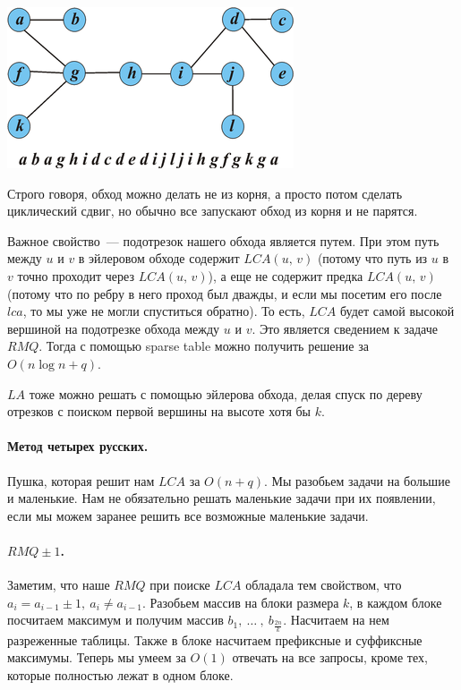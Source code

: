 \documentclass[12pt]{article}
\begin{document}
\begin{center}
\includegraphics{pictures/euler_path_on_tree.png}
\end{center}

Строго говоря, обход можно делать не из корня, а просто потом сделать циклический сдвиг, но обычно все запускают обход из корня и не парятся.

Важное свойство~--- подотрезок нашего обхода является путем. При этом путь между $u$ и $v$ в эйлеровом обходе содержит $LCA(u,\,v)$ (потому что путь из $u$ в $v$ точно проходит через $LCA(u,\,v)$), а еще не содержит предка $LCA(u,\,v)$ (потому что по ребру в него проход был дважды, и если мы посетим его после $lca$, то мы уже не могли спуститься обратно). То есть, $LCA$ будет самой высокой вершиной на подотрезке обхода между $u$ и $v$. Это является сведением к задаче $RMQ$. Тогда с помощью sparse table можно получить решение за $O(n \log n + q)$.

$LA$ тоже можно решать с помощью эйлерова обхода, делая спуск по дереву отрезков с поиском первой вершины на высоте хотя бы $k$.

\paragraph{Метод четырех русских.} Пушка, которая решит нам $LCA$ за $O(n + q)$. Мы разобьем задачи на большие и маленькие. Нам не обязательно решать маленькие задачи при их появлении, если мы можем заранее решить все возможные маленькие задачи.

\paragraph{$RMQ \pm 1$.} Заметим, что наше $RMQ$ при поиске $LCA$ обладала тем свойством, что $a_i = a_{i - 1} \pm 1,\ a_i \neq a_{i - 1}$. Разобьем массив на блоки размера $k$, в каждом блоке посчитаем максимум и получим массив $b_1,\ \ldots\ ,\ b_{\frac{2n}{k}}$. Насчитаем на нем разреженные таблицы. Также в блоке насчитаем префиксные и суффиксные максимумы. Теперь мы умеем за $O(1)$ отвечать на все запросы, кроме тех, которые полностью лежат в одном блоке.
\end{document}
